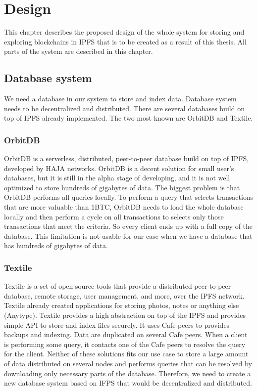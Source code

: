 \chapter{Design}
\label{Design}
This chapter describes the proposed design of the whole system for storing and exploring blockchains in IPFS that is to be created as a result of this thesis. All parts of the system are described in this chapter.

\section{Database system}
We need a database in our system to store and index data. Database system needs to be decentralized and distributed. There are several databases build on top of IPFS already implemented. The two most known are OrbitDB and Textile.

\subsection{OrbitDB}
OrbitDB is a serverless, distributed, peer-to-peer database build on top of IPFS, developed by HAJA networks. OrbitDB is a decent solution for small user's databases, but it is still in the alpha stage of developing, and it is not well optimized to store hundreds of gigabytes of data. The biggest problem is that OrbitDB performs all queries locally. To perform a query that selects transactions that are more valuable than 1BTC, OrbitDB needs to load the whole database locally and then perform a cycle on all transactions to selects only those transactions that meet the criteria. So every client ends up with a full copy of the database. This limitation is not usable for our case when we have a database that has hundreds of gigabytes of data.

\subsection{Textile}
Textile is a set of open-source tools that provide a distributed peer-to-peer database, remote storage, user management, and more, over the IPFS network. Textile already created applications for storing photos, notes or anything else (Anytype). Textile provides a high abstraction on top of the IPFS and provides simple API to store and index files securely. It uses Cafe peers to provides backups and indexing. Data are duplicated on several Cafe peers. When a client is performing some query, it contacts one of the Cafe peers to resolve the query for the client.
Neither of these solutions fits our use case to store a large amount of data distributed on several nodes and performs queries that can be resolved by downloading only necessary parts of the database. Therefore, we need to create a new database system based on IFPS that would be decentralized and distributed.

